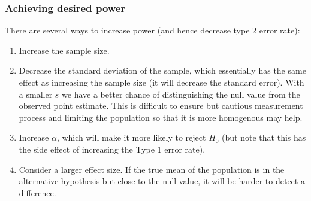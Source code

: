 \documentclass[slidestop,compress,mathserif]{beamer}
\begin{document}
\begin{frame}
\frametitle{Achieving desired power}

There are several ways to increase power (and hence decrease type 2 error rate):

\pause

{\small
\begin{enumerate}

\item Increase the sample size.

\pause

\item Decrease the standard deviation of the sample, which essentially has the same effect as increasing the sample size (it will decrease the standard error). With a smaller $s$ we have a better chance of distinguishing the null value from the observed point estimate. This is difficult to ensure but cautious measurement process and limiting the population so that it is more homogenous may help.

\pause

\item Increase $\alpha$, which will make it more likely to reject $H_0$ (but note that this has the side effect of increasing the Type 1 error rate).

\pause

\item Consider a larger effect size. If the true mean of the population is in the alternative hypothesis but close to the null value, it will be harder to detect a difference.

\end{enumerate}
}

\end{frame}


\end{document}
